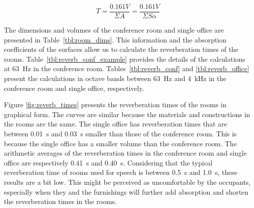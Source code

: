     \begin{equation}\label{eq:reverb}
		T = \frac{0.161 V}{\Sigma A} = \frac{0.161 V}{\Sigma S \alpha}
	\end{equation}

The dimensions and volumes of the conference room and single office are presented in Table~\ref{tbl:room_dims}.
This information and the absorption coefficients of the surfaces allow us to calculate the reverberation times of the rooms.
Table~\ref{tbl:reverb_conf_example} provides the details of the calculations at 63~Hz in the conference room.
Tables~\ref{tbl:reverb_conf} and \ref{tbl:reverb_office} present the calculations in octave bands between 63~Hz and 4~kHz in the conference room and single office, respectively.

Figure \ref{fig:reverb_times} presents the reverberation times of the rooms in graphical form.
The curves are similar because the materials and constructions in the rooms are the same.
The single office has reverberation times that are between 0.01~s and 0.03~s smaller than those of the conference room.
This is because the single office has a smaller volume than the conference room.
The arithmetic averages of the reverberation times in the conference room and single office are respectively 0.41~s and 0.40~s.
Considering that the typical reverberation time of rooms used for speech is between 0.5~s and 1.0~s, these results are a bit low.
This might be perceived as uncomfortable by the occupants, especially when they and the furnishings will further add absorption and shorten the reverberation times in the rooms.









